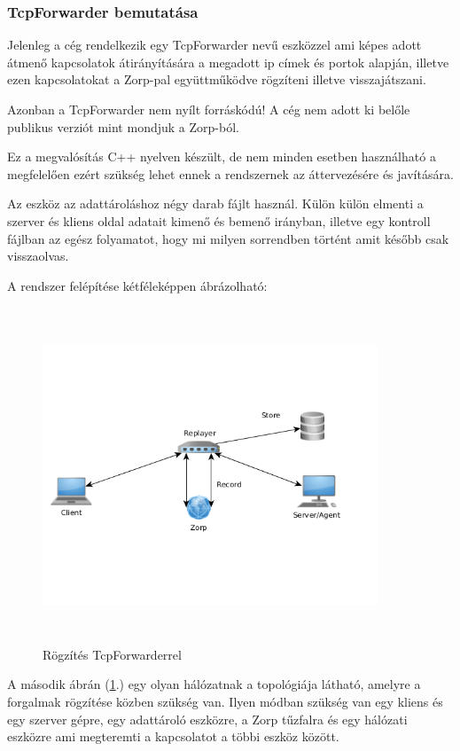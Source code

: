 \documentclass[a4paper,12pt,oneside]{report}
\begin{document}
\subsubsection{TcpForwarder bemutatása}

Jelenleg a cég rendelkezik egy TcpForwarder nevű eszközzel ami képes adott átmenő kapcsolatok átirányítására a megadott ip címek és portok alapján, illetve ezen kapcsolatokat a Zorp-pal együttműködve rögzíteni illetve visszajátszani.

Azonban a TcpForwarder nem nyílt forráskódú! A cég nem adott ki belőle publikus verziót mint mondjuk a Zorp-ból.

Ez a megvalósítás C++ nyelven készült, de nem minden esetben használható a megfelelően ezért szükség lehet ennek a rendszernek az áttervezésére és javítására.

Az eszköz az adattároláshoz négy darab fájlt használ.
Külön külön elmenti a szerver és kliens oldal adatait kimenő és bemenő irányban, illetve egy kontroll fájlban az egész folyamatot, hogy mi milyen sorrendben történt amit később csak
visszaolvas.

A rendszer felépítése kétféleképpen ábrázolható:

\begin{figure}[h]
  \includegraphics[width=10cm,height=10cm,keepaspectratio]{record.png}
  \caption{Rögzítés TcpForwarderrel}
  \label{fig:record}
\end{figure}

A második ábrán (\ref{fig:record}.) egy olyan hálózatnak a topológiája látható, amelyre a forgalmak rögzítése közben szükség van.
Ilyen módban szükség van egy kliens és egy szerver gépre, egy adattároló eszközre, a Zorp tűzfalra és egy hálózati eszközre ami megteremti a kapcsolatot a többi eszköz között.
\end{document}
